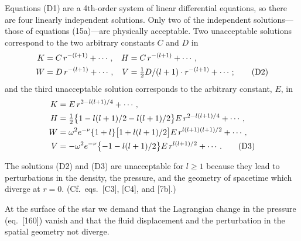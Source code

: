 Equations (D1) are a 4th-order system of linear differential equations, so there are four
linearly independent solutions. Only two of the independent solutions---those of equations
(15a)---are physically acceptable. Two unacceptable solutions correspond to the two arbitrary
constants $C$ and $D$ in
%
\begin{align}
K &= C\,r^{-(l+1)} + \cdots \,, & H &= C\,r^{-(l+1)} + \cdots \,,
\notag \\
W &= D\,r^{-(l+1)} + \cdots \,, & V &= \tfrac{1}{2} D/(l+1)\cdot r^{-(l+1)} + \cdots \,;
\tag{D2}
\end{align}
%
and the third unacceptable solution corresponds to the arbitrary constant, $E$, in
%
\begin{align}
K &= E\,r^{2-l(l+1)/4} + \cdots \,, \notag \\
H &= \tfrac{1}{2}\bigl\{1 - l(l+1)/2 - l(l+1)/2\bigr\} E\,r^{2-l(l+1)/4} + \cdots \,, \notag \\
W &= \omega^2 e^{-\nu}\{1+l\}\bigl[1 + l(l+1)/2\bigr] E\,r^{l(l+1)(l+1)/2} + \cdots \,, \notag \\
V &= -\omega^2 e^{-\nu}\bigl\{-1 - l(l+1)/2\bigr\} E\,r^{l(l+1)/2} + \cdots \,.
\tag{D3}
\end{align}

The solutions (D2) and (D3) are unacceptable for $l \geq 1$ because they lead to perturbations
in the density, the pressure, and the geometry of spacetime which diverge at $r = 0$. (Cf.\ eqs.\
[C3], [C4], and [7b].)

At the surface of the star we demand that the Lagrangian change in the pressure (eq.\ [160])
vanish and that the fluid displacement and the perturbation in the spatial geometry not diverge.
